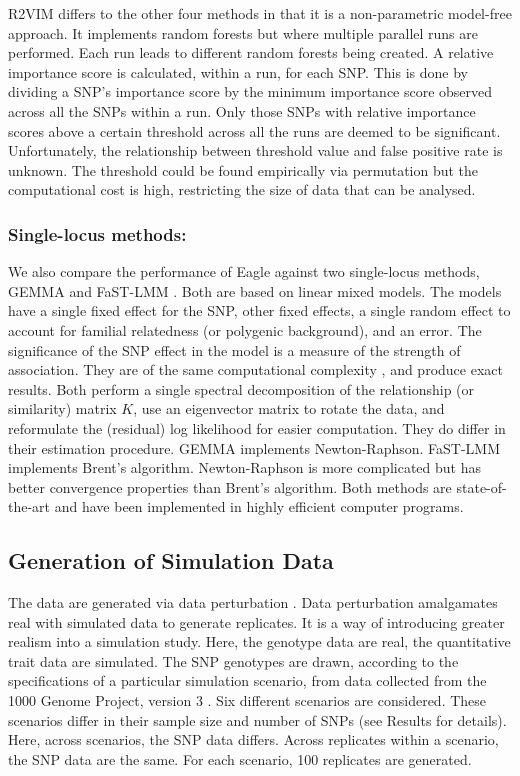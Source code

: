 \documentclass{article}
\begin{document}
  
R2VIM differs to the other four methods in that it is a non-parametric model-free approach. It implements  
random forests but where multiple parallel runs are performed. Each run leads to 
different random forests being created.  A relative importance score is calculated, within a run,  for each SNP. This is done by dividing a SNP's 
importance score by the minimum importance score observed across all the SNPs within a run. 
Only those SNPs with relative importance scores above a certain threshold across all the runs are deemed to be significant. 
Unfortunately, the relationship between threshold value and false positive rate is unknown. The threshold could be found empirically via permutation 
but the computational cost is high, restricting the size of data that can be analysed. 



\subsubsection{Single-locus methods:} We also compare the performance of Eagle against two single-locus methods, GEMMA \citep{zhou2012genome} and FaST-LMM \citep{lippert2011fast}. Both are based on linear mixed models. The models have a single fixed effect for the SNP,  other fixed effects, 
a single random effect to account for familial relatedness (or polygenic background), and an error. The significance of the SNP effect in the model 
is a measure of the strength of association.  They are of the same computational complexity \citep{zhou2012genome}, and produce exact results.  
Both perform a single spectral decomposition of the relationship (or similarity) matrix $K$, use  an eigenvector matrix to rotate the data, 
and reformulate the (residual) log likelihood for easier computation. They do differ in their estimation procedure. GEMMA implements Newton-Raphson. 
FaST-LMM implements Brent's algorithm. Newton-Raphson is more complicated but has better convergence properties than Brent's algorithm. 
Both methods are state-of-the-art and have been implemented in highly efficient computer programs. 



\subsection{Generation of Simulation Data}
\label{subsection:simdata}

The data are generated via data perturbation \citep{zhao2007arabidopsis}. 
Data perturbation amalgamates real with simulated data to generate replicates. 
It is a way of introducing greater realism into a simulation study. 
 Here, the genotype data are real, the 
quantitative trait data are simulated. 
 The SNP genotypes are drawn, 
according to the specifications of a particular simulation scenario, from data collected from the 1000 Genome Project, version 3   \citep{10002010map}. Six different scenarios are considered. These scenarios differ in  their sample size and number of 
SNPs (see Results for details).  Here, across scenarios, the SNP data differs. Across replicates within a scenario, the SNP data are the same. For each scenario, 100 replicates are generated. 
\end{document}
